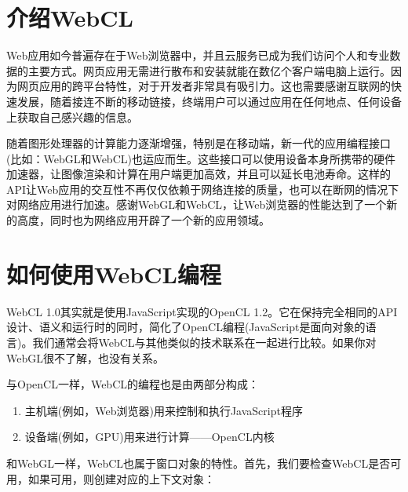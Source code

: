 

\section{介绍WebCL}

Web应用如今普遍存在于Web浏览器中，并且云服务已成为我们访问个人和专业数据的主要方式。网页应用无需进行散布和安装就能在数亿个客户端电脑上运行。因为网页应用的跨平台特性，对于开发者非常具有吸引力。这也需要感谢互联网的快速发展，随着接连不断的移动链接，终端用户可以通过应用在任何地点、任何设备上获取自己感兴趣的信息。

随着图形处理器的计算能力逐渐增强，特别是在移动端，新一代的应用编程接口(比如：WebGL和WebCL)也运应而生。这些接口可以使用设备本身所携带的硬件加速器，让图像渲染和计算在用户端更加高效，并且可以延长电池寿命。这样的API让Web应用的交互性不再仅仅依赖于网络连接的质量，也可以在断网的情况下对网络应用进行加速。感谢WebGL和WebCL，让Web浏览器的性能达到了一个新的高度，同时也为网络应用开辟了一个新的应用领域。



\section{如何使用WebCL编程}

WebCL 1.0其实就是使用JavaScript实现的OpenCL 1.2。它在保持完全相同的API设计、语义和运行时的同时，简化了OpenCL编程(JavaScript是面向对象的语言)。我们通常会将WebCL与其他类似的技术联系在一起进行比较。如果你对WebGL很不了解，也没有关系。

与OpenCL一样，WebCL的编程也是由两部分构成：

\begin{enumerate}
\item 主机端(例如，Web浏览器)用来控制和执行JavaScript程序
\item 设备端(例如，GPU)用来进行计算——OpenCL内核
\end{enumerate}

和WebGL一样，WebCL也属于窗口对象的特性。首先，我们要检查WebCL是否可用，如果可用，则创建对应的上下文对象：

